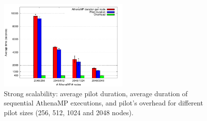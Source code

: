 \begin{figure}[!htb]
        \includegraphics[height=4.5cm,width=\columnwidth]{./figures/NGE/strong.pdf}
    \caption{Strong scalability:  average pilot duration, average duration of
    sequential AthenaMP executions, and pilot's overhead for different pilot
    sizes (256, 512, 1024 and 2048 nodes).}
\label{fig:strongScala}
\end{figure}
